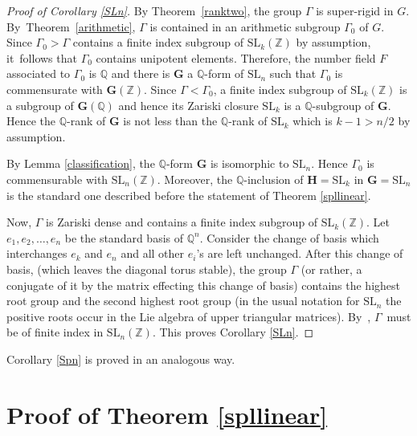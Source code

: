 \documentclass[JEP,XML,SOM,Unicode,published]{cedram}
\newcommand{\bG}{\boldsymbol{G}}
\theoremstyle{definition}
\newcommand{\field}[1]{\mathbb{#1}}
\newcommand{\Q}{\field{Q}}
\newcommand{\Z}{\field{Z}}
\newcommand{\SL}{\mathrm{SL}}
\begin{document}
\begin{proof} [Proof of Corollary \ref{SLn}] By Theorem~\ref{ranktwo}, the
group $\Gamma $ is super-rigid in $G$. By~Theorem~\ref{arithmetic},
$\Gamma $ is contained in an arithmetic subgroup $\Gamma_0$ of $G$.
Since $\Gamma_0 > \Gamma $ contains a finite index subgroup of
$\SL_k(\Z)$ by assumption, it~follows that $\Gamma_0$ contains
unipotent elements. Therefore, the number field $F$ associated to
$\Gamma_0$ is $\Q$ and there is $\bG$ a $\Q$-form of $\SL_n$ such that
$\Gamma_0$ is commensurate with $\bG(\Z)$. Since $\Gamma<\Gamma_0$,
a finite index subgroup of $\SL_k(\Z)$ is a subgroup of $\bG(\Q)$ and hence its
Zariski closure $\SL_k$ is a $\Q$-subgroup of $\bG$. Hence the $\Q$-rank of $\bG$ is
not less than the $\Q$-rank of $\SL_k$ which is $k-1>n/2$ by assumption.

By Lemma \ref{classification}, the $\Q$-form $\bG$ is isomorphic
to $\SL_n$. Hence $\Gamma_0$ is commensurable with $\SL_n(\Z)$.
Moreover, the $\Q$-inclusion of $\boldsymbol{H}=\SL_k$ in $\bG=\SL_n$ is
the standard one described before the statement of Theorem
\ref{spllinear}.

Now, $\Gamma$ is Zariski dense and contains a finite index subgroup of $\SL_k(\Z)$. Let
$e_1,e_2,\dots, e_n$ be the standard basis of $\Q^n$. Consider the
change of basis which interchanges $e_k$ and $e_n$ and all other
$e_i$'s are left unchanged. After this change of basis, (which leaves
the diagonal torus stable), the group $\Gamma$ (or rather, a
conjugate of it by the matrix effecting this change of basis) contains
the highest root group and the \hbox{second} highest root group (in the usual
notation for $\SL_n$ the positive roots occur in the Lie algebra of
upper triangular matrices). By~\cite[Th.\,(3.5) or Cor.\,3.6)]{V1}, $\Gamma$~must be of finite index in $\SL_n(\Z)$. This
proves Corollary \ref{SLn}.
\end{proof}

Corollary \ref{Spn} is proved in an analogous way.

\section{Proof of Theorem \ref{spllinear}}
\end{document}
